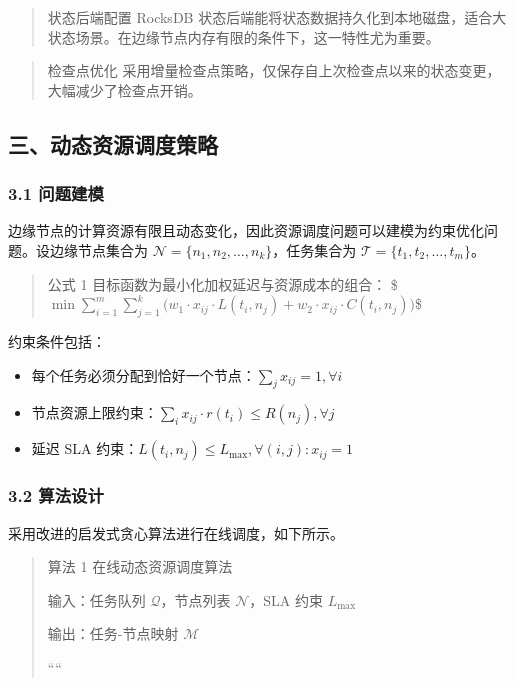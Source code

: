 \documentclass{harryopo-paper}
\begin{document}
\begin{quote}
{\fzht 状态后端配置} RocksDB 状态后端能将状态数据持久化到本地磁盘，适合大状态场景。在边缘节点内存有限的条件下，这一特性尤为重要。
\end{quote}

\begin{quote}
{\fzht 检查点优化} 采用增量检查点策略，仅保存自上次检查点以来的状态变更，大幅减少了检查点开销。
\end{quote}

\subsection*{三、动态资源调度策略}

\subsubsection*{3.1 问题建模}

边缘节点的计算资源有限且动态变化，因此资源调度问题可以建模为约束优化问题。设边缘节点集合为 $\mathcal{N} = \{n_1, n_2, \dots, n_k\}$，任务集合为 $\mathcal{T} = \{t_1, t_2, \dots, t_m\}$。

\begin{quote}
{\fzht 公式 1} 目标函数为最小化加权延迟与资源成本的组合：
\$$\min \sum_{i=1}^{m} \sum_{j=1}^{k} \bigl(w_1 \cdot x_{ij} \cdot L(t_i, n_j) + w_2 \cdot x_{ij} \cdot C(t_i, n_j)\bigr)$\$
\end{quote}

约束条件包括：

\begin{itemize}
  \item 每个任务必须分配到恰好一个节点：$\sum_{j} x_{ij} = 1, \forall i$
  \item 节点资源上限约束：$\sum_{i} x_{ij} \cdot r(t_i) \leq R(n_j), \forall j$
  \item 延迟 SLA 约束：$L(t_i, n_j) \leq L_{\max}, \forall (i,j): x_{ij}=1$
\end{itemize}

\subsubsection*{3.2 算法设计}

采用改进的启发式贪心算法进行在线调度，如下所示。

\begin{quote}
{\fzht 算法 1} 在线动态资源调度算法

{\fzht 输入}：任务队列 $\mathcal{Q}$，节点列表 $\mathcal{N}$，SLA 约束 $L_{\max}$

{\fzht 输出}：任务-节点映射 $\mathcal{M}$

````
\end{quote}
\end{document}
